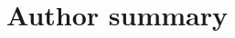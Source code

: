 \documentclass[10pt,letterpaper]{article}
\theoremstyle{plain}
\theoremstyle{remark}
\begin{document}

\section*{Author summary}

\end{document}
